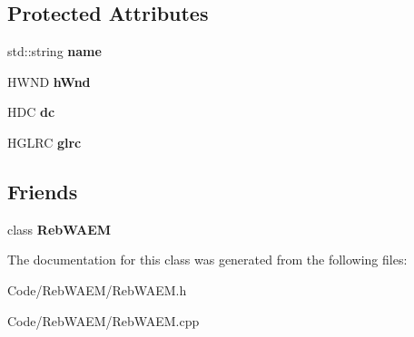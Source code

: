 \subsection*{Protected Attributes}
\begin{DoxyCompactItemize}
\item 
std\+::string {\bfseries name}\hypertarget{class_reb_window_ae4616d5adc2962d8c25387b5b7a6e5d4}{}\label{class_reb_window_ae4616d5adc2962d8c25387b5b7a6e5d4}

\item 
H\+W\+ND {\bfseries h\+Wnd}\hypertarget{class_reb_window_a56514650d8552ac87872fb1ba482b03a}{}\label{class_reb_window_a56514650d8552ac87872fb1ba482b03a}

\item 
H\+DC {\bfseries dc}\hypertarget{class_reb_window_a09c2f0181fcb49e018db92be4ed5ae73}{}\label{class_reb_window_a09c2f0181fcb49e018db92be4ed5ae73}

\item 
H\+G\+L\+RC {\bfseries glrc}\hypertarget{class_reb_window_abe371f88e0eed2c07178a6002882d480}{}\label{class_reb_window_abe371f88e0eed2c07178a6002882d480}

\end{DoxyCompactItemize}
\subsection*{Friends}
\begin{DoxyCompactItemize}
\item 
class {\bfseries Reb\+W\+A\+EM}\hypertarget{class_reb_window_a56116e2ffc394aa43ad35ef8b4595d95}{}\label{class_reb_window_a56116e2ffc394aa43ad35ef8b4595d95}

\end{DoxyCompactItemize}


The documentation for this class was generated from the following files\+:\begin{DoxyCompactItemize}
\item 
Code/\+Reb\+W\+A\+E\+M/Reb\+W\+A\+E\+M.\+h\item 
Code/\+Reb\+W\+A\+E\+M/Reb\+W\+A\+E\+M.\+cpp\end{DoxyCompactItemize}
